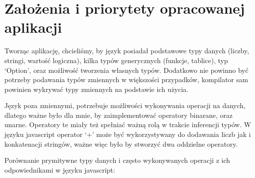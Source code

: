 \documentclass{article}
\begin{document}
\section{Założenia i priorytety opracowanej aplikacji}
Tworząc aplikację, chcieliśmy, by język posiadał podstawowe typy danych (liczby, stringi, wartość logiczna), kilka typów generycznych (funkcje, tablice), typ `Option', oraz możliwość tworzenia własnych typów.
Dodatkowo nie powinno być potrzeby podawania typów zmiennych w większości przypadków, kompilator sam powinien wykrywać typy zmiennych na podstawie ich użycia.


Język poza zmiennymi, potrzebuje możliwości wykonywania operacji na danych, dlatego ważne było dla mnie, by zaimplementować operatory binarane, oraz unarne. Operatory te miały też spełniać ważną rolą w trakcie inferencji typów. W języku javascript operator `+' może być wykorzystywany do dodawania liczb jak i konkatenacji stringów, ważne więc było by stworzyć dwa oddzielne operatory.



Porównanie prymitywne typy danych i często wykonywanych operacji z ich odpowiednikami w języku javascript:
\end{document}
